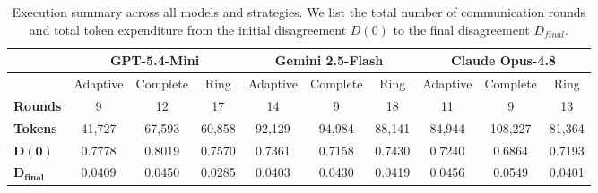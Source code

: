 \documentclass[journal,twoside,web]{ieeecolor_no_firstpage_logo}
\begin{document}
\begin{table}[ht]
    \centering
     \caption{Execution summary across all models and strategies. We list the total number of communication rounds and total token expenditure from the initial disagreement $D(0)$ to the final disagreement $D_{final}.$}
    \label{tab:all_summary}
    \renewcommand{\arraystretch}{1.2} %
    \begin{tabular}{lccccccccc}
        \toprule
        & \multicolumn{3}{c}{\textbf{GPT-5.4-Mini}} & \multicolumn{3}{c}{\textbf{Gemini 2.5-Flash}} & \multicolumn{3}{c}{\textbf{Claude Opus-4.8}} \\ 
        \toprule
        & Adaptive & Complete & Ring & Adaptive & Complete & Ring & Adaptive & Complete & Ring \\ \bottomrule
        \textbf{Rounds} & 9 & 12 & 17 & 14 & 9 & 18 & 11 & 9 & 13 \\ 
        \textbf{Tokens} & 41,727 & 67,593 & 60,858 & 92,129 & 94,984 & 88,141 & 84,944 & 108,227 & 81,364 \\ 
        $\mathbf{D(0)}$ & 0.7778 & 0.8019 & 0.7570 & 0.7361 & 0.7158 & 0.7430 & 0.7240 & 0.6864 & 0.7193 \\ 
        $\mathbf{D_{final}}$ & 0.0409 & 0.0450 & 0.0285 & 0.0403 & 0.0430 & 0.0419 & 0.0456 & 0.0549 & 0.0401 \\ \bottomrule
    \end{tabular}
\end{table}
\end{document}
